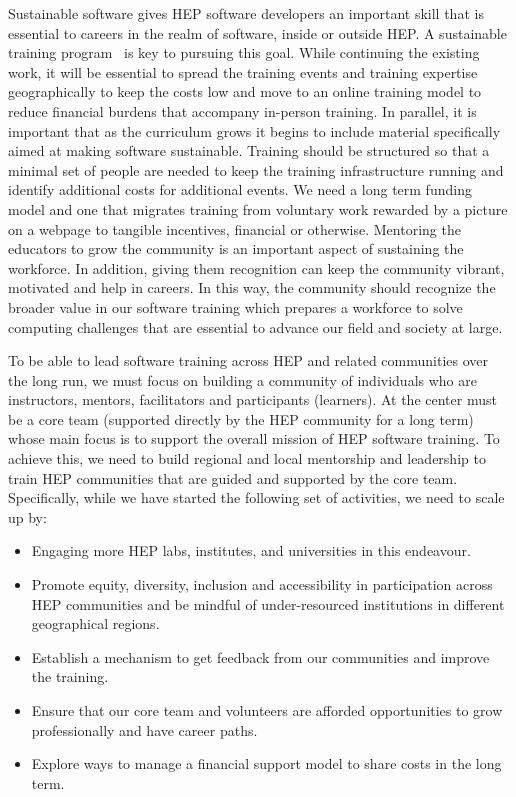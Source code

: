 \documentclass[twocolumn]{svjour3}          %
\begin{document}
Sustainable software \cite{dan_katz}  gives HEP software developers an important skill that is essential to careers in the realm of software, inside or outside HEP. A sustainable training program~\cite{sustainability_flashtalk} is key to pursuing this goal. While continuing the existing work, it will be essential to  spread the training events and training expertise geographically to keep the costs low and move to an online training model to reduce financial burdens that accompany in-person training. In parallel, it is important that as the curriculum grows it begins to include material specifically aimed at making software sustainable.  Training should be structured so that a minimal set of people are needed to keep the training infrastructure running and identify additional costs for additional events. We need a long term funding model and one that migrates training from voluntary work rewarded by a picture on a webpage to tangible incentives, financial or otherwise. Mentoring the educators to grow the community is an important aspect of sustaining the workforce. In addition, giving them recognition can keep the community vibrant, motivated and help in careers. In this way, the community should recognize the broader value in our software training which prepares a workforce to solve computing challenges that are essential to advance our field and society at large.

To be able to lead software training across HEP and related communities over the long run, we must focus on building a community of individuals who are instructors, mentors, facilitators and participants (learners).  At the center must be a core team (supported directly by the HEP community for a long term) whose main focus is to support the overall mission of HEP software training. To achieve this, we need to build regional and local mentorship and leadership to train HEP communities that are guided and supported by the core team. Specifically, while we have started the following set of activities, we need to scale up by:

\begin{itemize} 
 
\item Engaging more HEP labs, institutes, and universities in this endeavour. 
\item Promote equity, diversity, inclusion and accessibility in participation across HEP communities and  be mindful of under-resourced institutions in different geographical regions.
\item Establish a mechanism to get feedback from our communities and improve the training.
\item Ensure that our core team and volunteers are afforded opportunities to grow professionally and have career paths.
\item Explore ways to manage a financial support model to share costs in the long term.

\end{itemize}
\end{document}
